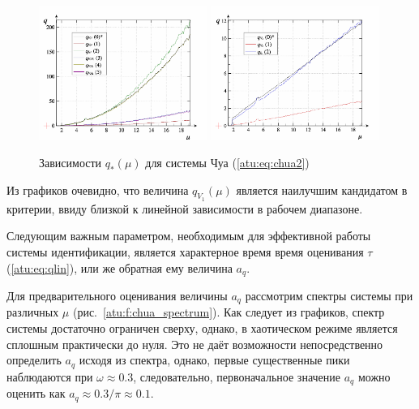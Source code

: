 \begin{figure}[htb!]
\centerline{
  \includegraphics[width=0.49\textwidth]{p/cha/chua/chua_q-p_mu2.png}
  \includegraphics[width=0.49\textwidth]{p/cha/chua/chua_q-p_mu1.png}
}
  \caption{Зависимости $q_{*}(\mu) $ для системы Чуа (\ref{atu:eq:chua2})}
\label{atu:f:chua_q}
\end{figure}

Из графиков очевидно, что величина $ q_{V_1}(\mu) $
является наилучшим кандидатом в критерии, ввиду близкой к линейной зависимости
в рабочем диапазоне.

Следующим важным параметром, необходимым для эффективной работы системы идентификации, является
характерное время время оценивания $\tau$ (\ref{atu:eq:qlin}), или же обратная ему величина $a_q$.

Для предварительного оценивания величины $a_q$ рассмотрим спектры системы при различных
$\mu$ (рис.~\ref{atu:f:chua_spectrum}). Как следует из графиков, спектр системы достаточно
ограничен сверху, однако, в хаотическом режиме является сплошным практически до нуля.
Это не даёт возможности непосредственно определить $a_q$ исходя из спектра,
однако, первые существенные пики наблюдаются при $ \omega \approx 0.3 $, следовательно,
первоначальное значение $a_q$ можно оценить как $ a_q \approx 0.3 / \pi \approx 0.1 $.


